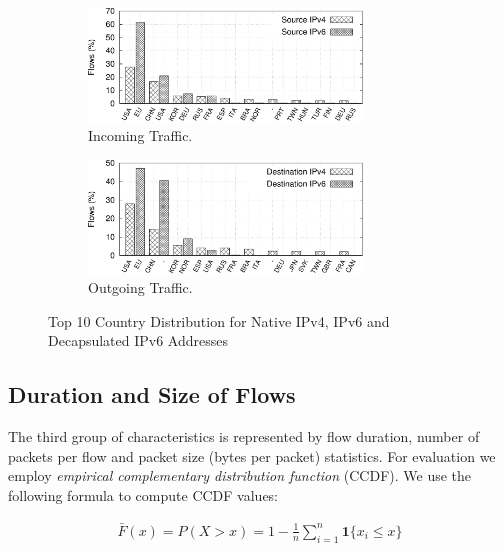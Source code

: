 \begin{figure}[!tb]
     \begin{subfigure}{\textwidth}
        \centering
        \includegraphics[width=0.8\textwidth]{figures/paper-tunnels/ctry_distribution/ctry_distribution-native-in}
        \caption{Incoming Traffic.}
        \label{fig:ipv6-tunnels-geo-native-in}
    \end{subfigure}
    \hfill
    \begin{subfigure}{\textwidth}
        \centering
        \includegraphics[width=0.8\textwidth]{figures/paper-tunnels/ctry_distribution/ctry_distribution-native-out}
        \caption{Outgoing Traffic.}
        \label{fig:ipv6-tunnels-geo-native-out}
    \end{subfigure}
    \caption{Top 10 Country Distribution for Native IPv4, IPv6 and Decapsulated IPv6 Addresses}
    \label{fig:ipv6-tunnels-top-ten-geo}
\end{figure}

\subsection{Duration and Size of Flows}
The third group of characteristics is represented by flow duration, number of packets per flow and packet size (bytes per packet) statistics. For evaluation we employ \textit{empirical complementary distribution function} (CCDF). We use the following formula to compute CCDF values:

\begin{align}
    \bar{F}(x)= P(X>x)=1-\frac{1}{n}\sum^{n}_{i=1}\mathbf{1}\{x_{i}\leq x\}
\end{align}


